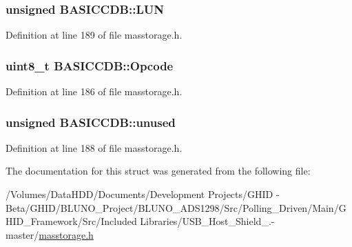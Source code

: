 \hypertarget{struct_b_a_s_i_c_c_d_b_a2cec985f2fd10576a004108c01d42fb4}{
\subsubsection[{\-L\-U\-N}]{\setlength{\rightskip}{0pt plus 5cm}unsigned {\bf \-B\-A\-S\-I\-C\-C\-D\-B\-::\-L\-U\-N}}}\label{struct_b_a_s_i_c_c_d_b_a2cec985f2fd10576a004108c01d42fb4}


\-Definition at line 189 of file masstorage.\-h.

\hypertarget{struct_b_a_s_i_c_c_d_b_a64d8bea0216a84b8ba8c8f411ceae2c3}{
\subsubsection[{\-Opcode}]{\setlength{\rightskip}{0pt plus 5cm}uint8\-\_\-t {\bf \-B\-A\-S\-I\-C\-C\-D\-B\-::\-Opcode}}}\label{struct_b_a_s_i_c_c_d_b_a64d8bea0216a84b8ba8c8f411ceae2c3}


\-Definition at line 186 of file masstorage.\-h.

\hypertarget{struct_b_a_s_i_c_c_d_b_a2c6031f3dde94acd5d03c80db213c534}{
\subsubsection[{unused}]{\setlength{\rightskip}{0pt plus 5cm}unsigned {\bf \-B\-A\-S\-I\-C\-C\-D\-B\-::unused}}}\label{struct_b_a_s_i_c_c_d_b_a2c6031f3dde94acd5d03c80db213c534}


\-Definition at line 188 of file masstorage.\-h.



\-The documentation for this struct was generated from the following file\-:\begin{DoxyCompactItemize}
\item 
/\-Volumes/\-Data\-H\-D\-D/\-Documents/\-Development Projects/\-G\-H\-I\-D -\/ Beta/\-G\-H\-I\-D/\-B\-L\-U\-N\-O\-\_\-\-Project/\-B\-L\-U\-N\-O\-\_\-\-A\-D\-S1298/\-Src/\-Polling\-\_\-\-Driven/\-Main/\-G\-H\-I\-D\-\_\-\-Framework/\-Src/\-Included Libraries/\-U\-S\-B\-\_\-\-Host\-\_\-\-Shield\-\_.-\/master/\hyperlink{masstorage_8h}{masstorage.\-h}\end{DoxyCompactItemize}
